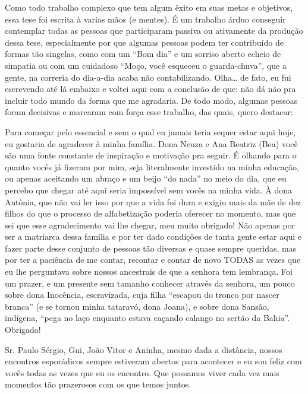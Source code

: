 \documentclass[12pt,openright,oneside,a4paper,english]{abntex2}
\begin{document}
\begin{agradecimentos}[Agradecimentos]
Como todo trabalho complexo que tem algum êxito em suas metas e objetivos, essa tese foi escrita à varias mãos (e mentes). É um trabalho árduo conseguir contemplar todas as pessoas que participaram passiva ou ativamente da produção dessa tese, especialmente por que algumas pessoas podem ter contribuído de formas tão singelas, como com um “Bom dia” e um sorriso aberto echeio de simpatia ou com um cuidadoso “Moço, você esqueceu o guarda-chuva”, que a gente, na correria do dia-a-dia acaba não contabilizando. Olha… de fato, eu fui escrevendo até lá embaixo e voltei aqui com a conclusão de que: não dá não pra incluir todo mundo da forma que me agradaria. De todo modo, algumas pessoas foram decisivas e marcaram com força esse trabalho, das quais, quero destacar:

Para começar pelo essencial e sem o qual eu jamais teria sequer  estar aqui hoje, eu gostaria de agradecer à minha família. Dona Neuza e Ana Beatriz (Bea) você são uma fonte constante de inspiração e motivação pra seguir. É olhando para o quanto vocês já fizeram por mim, seja literalmente investido na minha educação, ou apenas aceitando um abraço e um beijo “do nada” no meio do dia, que eu percebo que chegar até aqui seria impossível sem vocês na minha vida. À dona Antônia, que não vai ler isso por que a vida foi dura e exigiu mais da mãe de dez filhos do que o processo de alfabetização poderia oferecer no momento, mas que sei que esse agradecimento vai lhe chegar, meu muito obrigado! Não apenas por ser a matriarca dessa família e por ter dado condições de tanta gente estar aqui e fazer parte desse conjunto de pessoas tão diversas e quase sempre queridas, mas por ter a paciência de me contar, recontar e contar de novo TODAS as vezes que eu lhe perguntava sobre nossos ancestrais de que a senhora tem lembrança. Foi um prazer, e um presente sem tamanho conhecer através da senhora, um pouco sobre dona Inocência, escravizada, cuja filha “escapou do tronco por nascer branca” (e se tornou minha tataravó, dona Joana), e sobre dona Sansão, indígena, “pega no laço enquanto estava caçando calango no sertão da Bahia”. Obrigado!

Sr. Paulo Sérgio, Gui, João Vitor e Aninha, mesmo dada a distância, nossos encontros esporádicos sempre estiveram abertos para acontecer e eu sou feliz com vocês todas as vezes que eu os encontro. Que possamos viver cada vez mais momentos tão prazerosos com os que temos juntos.


\end{agradecimentos}
\end{document}
